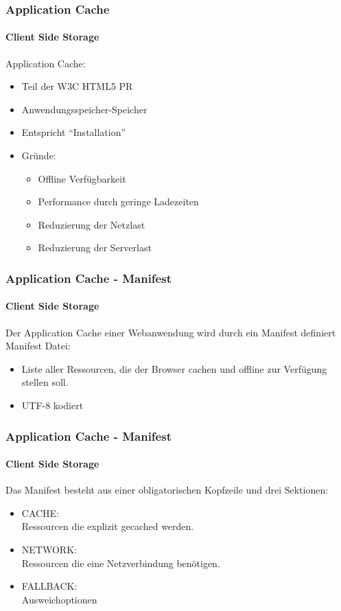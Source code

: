 \begin{frame}
\frametitle{Application Cache}
\framesubtitle{Client Side Storage}
	Application Cache:
	\begin{itemize}
		\item Teil der W3C HTML5 PR
		\item Anwendungsspeicher-Speicher
		\item Entspricht “Installation”
		\item Gründe:
		\begin{itemize}
			\item Offline Verfügbarkeit
			\item Performance durch geringe Ladezeiten
			\item Reduzierung der Netzlast
			\item Reduzierung der Serverlast
		\end{itemize}
	\end{itemize}
\end{frame}
\begin{frame}
\frametitle{Application Cache - Manifest}
\framesubtitle{Client Side Storage}

	Der Application Cache einer Webanwendung wird durch ein Manifest definiert \\
	\vspace{1cm}
	Manifest Datei:
	\begin{itemize}
		\item Liste aller Ressourcen, die der Browser cachen und offline zur Verfügung stellen soll.
		\item UTF-8 kodiert
	\end{itemize}
\end{frame}

\begin{frame}
\frametitle{Application Cache - Manifest}
\framesubtitle{Client Side Storage}

	Das Manifest besteht aus einer obligatorischen Kopfzeile und drei Sektionen: 
	\begin{itemize}
		\item CACHE: \\
			\setlength\parindent{20pt} Ressourcen die explizit gecached werden.
		\item NETWORK: \\
			\setlength\parindent{20pt} Ressourcen die eine Netzverbindung benötigen.
		\item FALLBACK: \\
			\setlength\parindent{20pt} Ausweichoptionen
	\end{itemize}
\end{frame}


